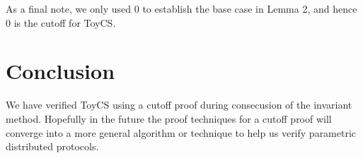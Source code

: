 \documentclass[12pt]{article}
\begin{document}
As a final note, we only used 0 to establish the base case in Lemma 2, and hence 0 is the cutoff for ToyCS.

\section{Conclusion}
We have verified ToyCS using a cutoff proof during consecusion of the invariant method.  Hopefully in the future the proof techniques for a cutoff proof will converge into a more general algorithm or technique to help us verify parametric distributed protocols.
\end{document}
